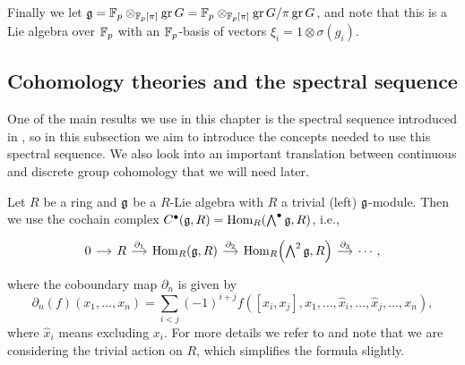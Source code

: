 Finally we let $\mathfrak{g} = \mathbb{F}_{p} \otimes_{\mathbb{F}_{p}[\pi]} \operatorname{gr} G = \mathbb{F}_{p} \otimes_{\mathbb{F}_{p}[\pi]} \operatorname{gr} G/\pi\operatorname{gr} G$, and note that this is a Lie algebra over $\mathbb{F}_{p}$ with an $\mathbb{F}_{p}$-basis of vectors $\xi_{i} = 1 \otimes \sigma(g_{i})$. %

\subsection{Cohomology theories and the spectral sequence}%
\label{subsec:coh-and-spec-seq}

One of the main results we use in this chapter is the spectral sequence introduced in \cite[§6.1]{Sor}, so in this subsection we aim to introduce the concepts needed to use this spectral sequence. We also look into an important translation between continuous and discrete group cohomology that we will need later.

Let $R$ be a ring and $\mathfrak{g}$ be a $R$-Lie algebra with $R$ a trivial (left) $\mathfrak{g}$-module. Then we use the cochain complex $C^\bullet(\mathfrak{g},R) = \operatorname{Hom}_{R}(\bigwedge^{\bullet}\mathfrak{g}, R)$, i.e.,
\[
  \begin{tikzcd}[column sep=small,row sep=tiny]
    0 \ar[r] & R \ar[r,"\partial_{1}"] & \Hom_{R}(\lie{g},R) \ar[r,"\partial_{2}"] & \Hom_{R}\Bigl(\bigwedge^2\lie{g}, R\Bigr) \ar[r,"\partial_{3}"] &  \cdots,
  \end{tikzcd}
\]
where the coboundary map $\partial_{n}$ is given by
\begin{equation*}
  \partial_{n}(f)(x_1,\dotsc,x_{n}) = \sum_{i<j}(-1)^{i+j}f([x_i,x_j],x_1,\dotsc,\widehat{x}_i,\dotsc,\widehat{x}_j,\dotsc,x_{n}),
\end{equation*}
where $\widehat{x}_{i}$ means excluding $x_{i}$. For more details we refer to \cite[Thm.~7.1]{CartanHomAlg} and note that we are considering the trivial action on $R$, which simplifies the formula slightly.

